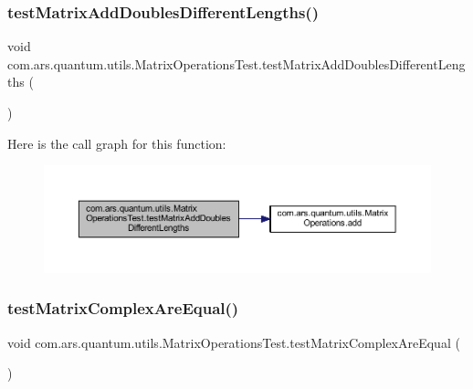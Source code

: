 \subsubsection{\texorpdfstring{test\+Matrix\+Add\+Doubles\+Different\+Lengths()}{testMatrixAddDoublesDifferentLengths()}}
{\footnotesize\ttfamily void com.\+ars.\+quantum.\+utils.\+Matrix\+Operations\+Test.\+test\+Matrix\+Add\+Doubles\+Different\+Lengths (\begin{DoxyParamCaption}{ }\end{DoxyParamCaption})}

Here is the call graph for this function\+:\nopagebreak
\begin{figure}[H]
\begin{center}
\leavevmode
\includegraphics[width=350pt]{classcom_1_1ars_1_1quantum_1_1utils_1_1_matrix_operations_test_a95be19fcaf80e4fa48732d3a03c55afc_cgraph}
\end{center}
\end{figure}
\hypertarget{classcom_1_1ars_1_1quantum_1_1utils_1_1_matrix_operations_test_a1f520804726b4695d38491efb081a62f}{}\label{classcom_1_1ars_1_1quantum_1_1utils_1_1_matrix_operations_test_a1f520804726b4695d38491efb081a62f} 
\subsubsection{\texorpdfstring{test\+Matrix\+Complex\+Are\+Equal()}{testMatrixComplexAreEqual()}}
{\footnotesize\ttfamily void com.\+ars.\+quantum.\+utils.\+Matrix\+Operations\+Test.\+test\+Matrix\+Complex\+Are\+Equal (\begin{DoxyParamCaption}{ }\end{DoxyParamCaption})}


